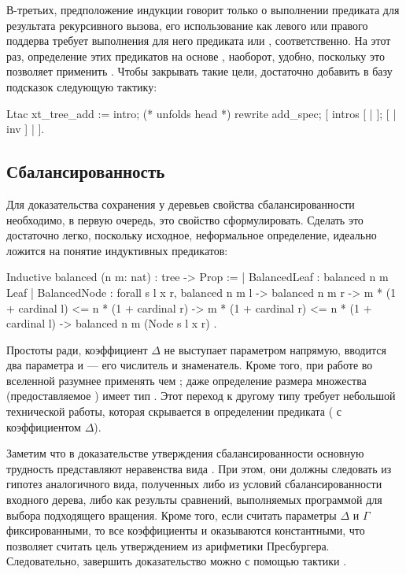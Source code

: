 \documentclass[a4paper,14pt]{extarticle}
\begin{document}
В-третьих, предположение индукции говорит только
о выполнении предиката 
для результата рекурсивного вызова,
его использование как левого или правого поддерва требует
выполнения для него предиката  или ,
соответственно.
На этот раз, определение этих предикатов на основе ,
наоборот, удобно, поскольку это позволяет применить .
Чтобы закрывать такие цели, достаточно добавить в базу подсказок 
следующую тактику:
\begin{coqcode}
Ltac xt_tree_add :=
  intro; (* unfolds head *)
  rewrite add_spec;
  [ intros [ | ]; [ | inv ] | ].
\end{coqcode}

\subsection{Сбалансированность}

Для доказательства сохранения у деревьев
свойства сбалансированности необходимо, в первую очередь,
это свойство сформулировать.
Сделать это достаточно легко,
поскольку исходное, неформальное определение,
идеально ложится на понятие индуктивных предикатов:
\begin{coqcode}
Inductive balanced (n m: nat) : tree -> Prop :=
  | BalancedLeaf : balanced n m Leaf
  | BalancedNode : forall s l x r,
      balanced n m l -> balanced n m r ->
      m * (1 + cardinal l) <= n * (1 + cardinal r) ->
      m * (1 + cardinal r) <= n * (1 + cardinal l) ->
      balanced n m (Node s l x r)
.
\end{coqcode}

Простоты ради, коэффициент \( \Delta \)
не выступает параметром напрямую,
вводится  два параметра  и  ---
его числитель и знаменатель.
Кроме того, при работе во вселенной 
разумнее применять  чем ;
даже определение размера множества 
(предоставляемое )
имеет тип .
Этот переход к другому типу требует небольшой технической
работы, которая скрывается в определении
предиката 
( с коэффициентом \( \Delta \)).

Заметим что в доказательстве утверждения сбалансированности
основную трудность представляют неравенства вида
.
При этом, они должны следовать из гипотез аналогичного вида, полученных
либо из условий сбалансированности входного дерева,
либо как результы сравнений, выполняемых программой
для выбора подходящего вращения.
Кроме того, если считать параметры
\( \Delta \) и \( \Gamma \)
фиксированными, то все коэффициенты  и 
оказываются константными,
что позволяет считать цель утверждением из арифметики Пресбургера.
Следовательно, завершить доказательство можно
с помощью тактики .
\end{document}
